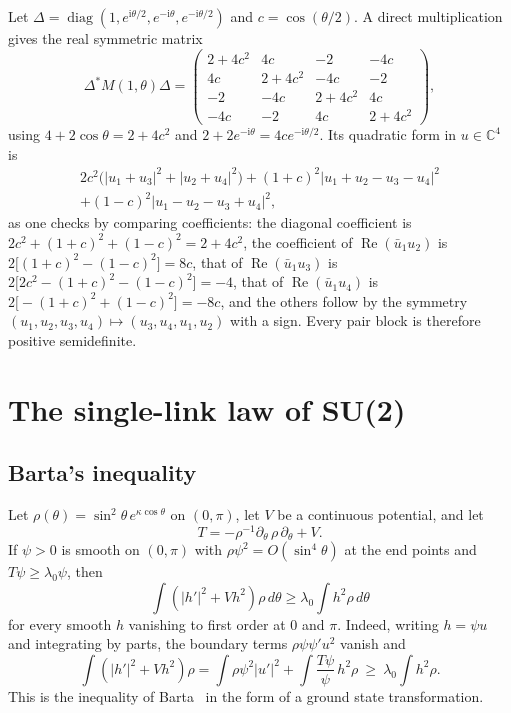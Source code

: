 \documentclass[aps,prd,twocolumn,superscriptaddress,nofootinbib,longbibliography,floatfix,amsmath,amssymb,10pt]{revtex4-2}
\theoremstyle{definition}
\theoremstyle{remark}
\newcommand{\C}{\mathbb{C}}
\begin{document}
Let $\Delta=\operatorname{diag}(1,e^{\mathrm i\theta/2},e^{-\mathrm i\theta},
e^{-\mathrm i\theta/2})$ and $c=\cos(\theta/2)$. A direct multiplication gives
the real symmetric matrix
\[
\Delta^*M(1,\theta)\Delta=\begin{pmatrix}2+4c^2&4c&-2&-4c\\4c&2+4c^2&-4c&-2\\
-2&-4c&2+4c^2&4c\\-4c&-2&4c&2+4c^2\end{pmatrix},
\]
using $4+2\cos\theta=2+4c^2$ and $2+2e^{-\mathrm i\theta}=4ce^{-\mathrm i
\theta/2}$. Its quadratic form in $u\in\C^4$ is
\begin{multline*}
2c^2\bigl(|u_1+u_3|^2+|u_2+u_4|^2\bigr)+(1+c)^2|u_1+u_2-u_3-u_4|^2\\
+(1-c)^2|u_1-u_2-u_3+u_4|^2,
\end{multline*}
as one checks by comparing coefficients: the diagonal coefficient is
$2c^2+(1+c)^2+(1-c)^2=2+4c^2$, the coefficient of $\operatorname{Re}(\bar
u_1u_2)$ is $2\bigl[(1+c)^2-(1-c)^2\bigr]=8c$, that of $\operatorname{Re}(\bar
u_1u_3)$ is $2\bigl[2c^2-(1+c)^2-(1-c)^2\bigr]=-4$, that of
$\operatorname{Re}(\bar u_1u_4)$ is $2\bigl[-(1+c)^2+(1-c)^2\bigr]=-8c$, and the
others follow by the symmetry $(u_1,u_2,u_3,u_4)\mapsto(u_3,u_4,u_1,u_2)$
with a sign. Every pair block is therefore positive semidefinite.

\section{The single-link law of SU(2)}\label{app:vmf}

\subsection{Barta's inequality}

Let $\rho(\theta)=\sin^2\theta\,e^{\kappa\cos\theta}$ on $(0,\pi)$, let $V$
be a continuous potential, and let
\[
T=-\rho^{-1}\partial_\theta\,\rho\,\partial_\theta+V .
\] If $\psi>0$ is smooth on $(0,\pi)$ with
$\rho\psi^2=O(\sin^4\theta)$ at the end points and $T\psi\ge\lambda_0\psi$,
then
\[
\int(|h'|^2+Vh^2)\rho\,d\theta\ge\lambda_0\int h^2\rho\,d\theta
\]
for every smooth $h$ vanishing to first order at $0$ and $\pi$. Indeed, writing
$h=\psi u$ and integrating by parts, the boundary terms $\rho\psi\psi'u^2$
vanish and
\[
\int(|h'|^2+Vh^2)\rho=\int\rho\psi^2|u'|^2+\int\frac{T\psi}\psi\,h^2\rho
\ \ge\ \lambda_0\int h^2\rho .
\]
This is the inequality of Barta~\cite{Bar37} in the form of a ground state
transformation.
\end{document}
